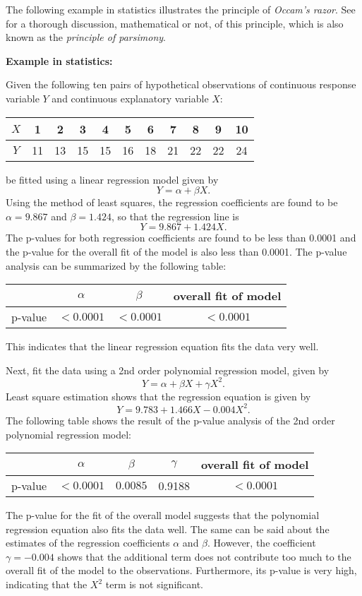 \documentclass[12pt]{article}
\begin{document}

The following example in statistics illustrates the principle of \emph{Occam's razor}.  See  for a thorough discussion, mathematical or not, of this principle, which is also known as the \emph{principle of parsimony}.

\textbf{Example in statistics:}

Given the following ten pairs of hypothetical observations of continuous response variable $Y$ and continuous explanatory variable $X$:
\begin{center}
\begin{tabular}{|c|c|c|c|c|c|c|c|c|c|c|}
\hline
$X$ & 1 & 2 & 3 & 4 & 5 & 6 & 7 & 8 & 9 & 10 \\
\hline
$Y$ & 11 & 13 & 15 & 15 & 16 & 18 & 21 & 22 & 22 & 24 \\
\hline
\end{tabular}
\end{center}
be fitted using a linear regression model given by 
$$Y=\alpha + \beta X.$$
Using the method of least squares, the regression coefficients are found to be $\alpha=9.867$ and $\beta=1.424$, so that the regression line is
$$Y=9.867+1.424X.$$
The p-values for both regression coefficients are found to be less than 0.0001 and the p-value for the overall fit of the model is also less than 0.0001.  The p-value analysis can be summarized by the following table:
\begin{center}
\begin{tabular}{|c|c|c|c|}
\hline
 & $\alpha$ & $\beta$ & overall fit of model \\
\hline
p-value & $<0.0001$ & $<0.0001$ & $<0.0001$ \\
\hline
\end{tabular}
\end{center}
This indicates that the linear regression equation fits the data very well.

Next, fit the data using a 2nd order polynomial regression model, given by
$$Y=\alpha + \beta X + \gamma X^2.$$
Least square estimation shows that the regression equation is given by 
$$Y=9.783 + 1.466X - 0.004X^2.$$
The following table shows the result of the p-value analysis of the 2nd order polynomial regression model:
\begin{center}
\begin{tabular}{|c|c|c|c|c|}
\hline
 & $\alpha$ & $\beta$ & $\gamma$ & overall fit of model \\
\hline
p-value & $<0.0001$ & $0.0085$ & 0.9188 & $<0.0001$ \\
\hline
\end{tabular}
\end{center}
The p-value for the fit of the overall model suggests that the polynomial regression equation also fits the data well.  The same can be said about the estimates of the regression coefficients $\alpha$ and $\beta$.  However, the coefficient $\gamma=-0.004$ shows that the additional term does not contribute too much to the overall fit of the model to the observations.  Furthermore, its p-value is very high, indicating that the $X^2$ term is not significant.
\end{document}
